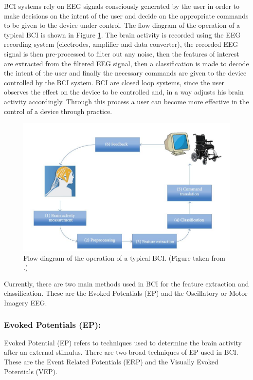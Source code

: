 BCI systems rely on EEG signals consciously generated by the user in order to make decisions on the intent of the user and decide on the appropriate commands to be given to the device under control. The flow diagram of the operation of a typical BCI is shown in Figure  \ref{BCI_F}. The brain activity is recorded using the EEG recording system (electrodes, amplifier and data converter), the recorded EEG signal is then pre-processed to filter out any noise, then the features of interest are extracted from the filtered EEG signal, then a classification is made to decode the intent of the user and finally the necessary commands are given to the device controlled by the BCI system. BCI are closed loop systems, since the user observes the effect on the device to be controlled and, in a way adjusts his brain activity accordingly. Through this process a user can become more effective in the control of a device through practice.  

\begin{figure}
	\centering
	\includegraphics[width=\linewidth]{Figures/BCI_Flow.jpg} %
	\caption{Flow diagram of the operation of a typical BCI. (Figure taken from \citep{Martisius2016}.) }
	\label{BCI_F} %
\end{figure}

Currently, there are two main methods used in BCI for the feature extraction and classification. These are the Evoked Potentials (EP) and the Oscillatory or Motor Imagery EEG. 

\subsubsection{\bf{Evoked Potentials (EP):}}
Evoked Potential (EP) refers to techniques used to determine the brain activity after an external stimulus. There are two broad techniques of EP used in BCI. These are the Event Related Potentials (ERP) and the Visually Evoked Potentials (VEP).

